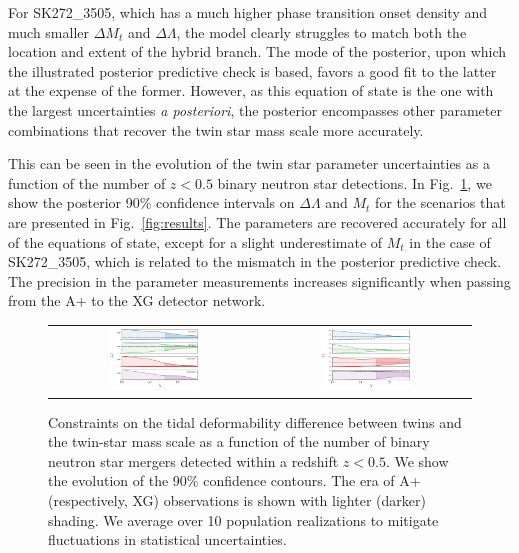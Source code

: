 \documentclass[aps,prd,twocolumn,superscriptaddress,nofootinbib]{revtex4-1}
\begin{document}
For SK272\_3505, which has a much higher phase transition onset density and much smaller $\Delta M_t$ and $\Delta\Lambda$, the model clearly struggles to match both the location and extent of the hybrid branch. The mode of the posterior, upon which the illustrated posterior predictive check is based, favors a good fit to the latter at the expense of the former. However, as this equation of state is the one with the largest uncertainties \textit{a posteriori}, the posterior encompasses other parameter combinations that recover the twin star mass scale more accurately.

This can be seen in the evolution of the twin star parameter uncertainties as a function of the number of $z < 0.5$ binary neutron star detections. In Fig.~\ref{fig:params}, we show the posterior 90\% confidence intervals on $\Delta\Lambda$ and $M_t$ for the scenarios that are presented in Fig.~\ref{fig:results}. The parameters are recovered accurately for all of the equations of state, except for a slight underestimate of $M_t$ in the case of SK272\_3505, which is related to the mismatch in the posterior predictive check. The precision in the parameter measurements increases significantly when passing from the A+ to the XG detector network.

\begin{figure}
    \begin{tabular}{cc}
      \includegraphics[width=0.45\textwidth]{DeltaL_convergence.png}   & \includegraphics[width=0.45\textwidth]{Mt_convergence.png}
    \end{tabular}
    \caption{Constraints on the tidal deformability difference between twins and the twin-star mass scale as a function of the number of binary neutron star mergers detected within a redshift $z < 0.5$. We show the evolution of the 90\% confidence contours. The era of A+ (respectively, XG) observations is shown with lighter (darker) shading. We average over 10 population realizations to mitigate fluctuations in statistical uncertainties.}
    \label{fig:params}
\end{figure}
\end{document}
